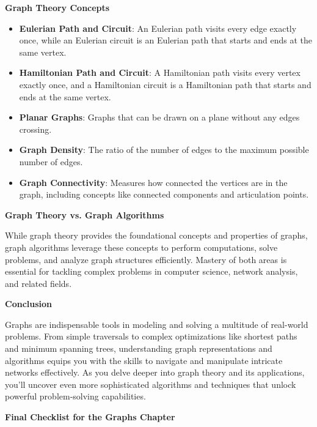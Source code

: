 \textbf{Graph Theory Concepts}

\begin{itemize}
    \item \textbf{Eulerian Path and Circuit}: An Eulerian path visits every edge exactly once, while an Eulerian circuit is an Eulerian path that starts and ends at the same vertex.
    \item \textbf{Hamiltonian Path and Circuit}: A Hamiltonian path visits every vertex exactly once, and a Hamiltonian circuit is a Hamiltonian path that starts and ends at the same vertex.
    \item \textbf{Planar Graphs}: Graphs that can be drawn on a plane without any edges crossing.
    \item \textbf{Graph Density}: The ratio of the number of edges to the maximum possible number of edges.
    \item \textbf{Graph Connectivity}: Measures how connected the vertices are in the graph, including concepts like connected components and articulation points.
\end{itemize}

\textbf{Graph Theory vs. Graph Algorithms}

While graph theory provides the foundational concepts and properties of graphs, graph algorithms leverage these concepts to perform computations, solve problems, and analyze graph structures efficiently. Mastery of both areas is essential for tackling complex problems in computer science, network analysis, and related fields.

\textbf{Conclusion}

Graphs are indispensable tools in modeling and solving a multitude of real-world problems. From simple traversals to complex optimizations like shortest paths and minimum spanning trees, understanding graph representations and algorithms equips you with the skills to navigate and manipulate intricate networks effectively. As you delve deeper into graph theory and its applications, you'll uncover even more sophisticated algorithms and techniques that unlock powerful problem-solving capabilities.

\textbf{Final Checklist for the Graphs Chapter}

